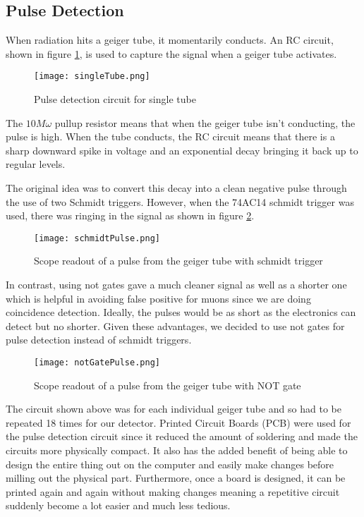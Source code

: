 \documentclass[oneside]{article}
\begin{document}
    \subsection{Pulse Detection}
      When radiation hits a geiger tube, it momentarily conducts. An RC circuit, shown in figure \ref{singleTube}, is used to capture the signal when a geiger tube activates.

      \begin{figure}[H]
          \centering
          \texttt{[image: singleTube.png]}
          \caption{Pulse detection circuit for single tube}
          \label{singleTube}
      \end{figure}

      The $10 M \omega$ pullup resistor means that when the geiger tube isn't conducting, the pulse is high. When the tube conducts, the RC circuit means that there is a sharp downward spike in voltage and an exponential decay bringing it back up to regular levels.

      The original idea was to convert this decay into a clean negative pulse through the use of two Schmidt triggers. However, when the 74AC14 schmidt trigger was used, there was ringing in the signal as shown in figure \ref{schmidtPulse}.

      \begin{figure}[H]
          \centering
          \texttt{[image: schmidtPulse.png]}
          \caption{Scope readout of a pulse from the geiger tube with schmidt trigger}
          \label{schmidtPulse}
      \end{figure}

      In contrast, using not gates gave a much cleaner signal as well as a shorter one which is helpful in avoiding false positive for muons since we are doing coincidence detection. Ideally, the pulses would be as short as the electronics can detect but no shorter. Given these advantages, we decided to use not gates for pulse detection instead of schmidt triggers.

      \begin{figure}[H]
          \centering
          \texttt{[image: notGatePulse.png]}
          \caption{Scope readout of a pulse from the geiger tube with NOT gate}
          \label{notGatePulse}
      \end{figure}

      The circuit shown above was for each individual geiger tube and so had to be repeated 18 times for our detector. Printed Circuit Boards (PCB) were used for the pulse detection circuit since it reduced the amount of soldering and made the circuits more physically compact. It also has the added benefit of being able to design the entire thing out on the computer and easily make changes before milling out the physical part. Furthermore, once a board is designed, it can be printed again and again without making changes meaning a repetitive circuit suddenly become a lot easier and much less tedious.
\end{document}
